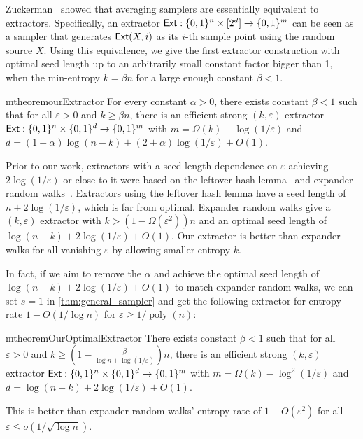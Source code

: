 \documentclass[10pt,a4paper]{article}
\DeclareMathOperator*{\poly}{poly}
\newcommand{\eps}{\varepsilon}
\newcommand{\1}{\mathbbm{1}}
\newcommand{\zo}{\{0, 1\}}
\newcommand{\Ext}{\textup{\textsf{Ext}}}
\begin{document}
Zuckerman~\cite{zuckerman1997randomness} showed that averaging samplers are essentially equivalent to extractors. Specifically, an extractor $\Ext: \zo^n \times [2^d] \to \zo^m$ can be seen as a sampler that generates $\Ext(X, i)$ as its $i$-th sample point using the random source $X$. Using this equivalence, we give the first extractor construction with optimal seed length up to an arbitrarily small constant factor bigger than 1, when the min-entropy $k = \beta n$ for a large enough constant $\beta < 1$.


\begin{restatable}{mtheorem}{ourExtractor}
    \label{thm:our_extractor}
    For every constant $\alpha > 0$, there exists constant $\beta < 1$ such that for all $\eps > 0$ and $k \ge  \beta n$, there is an efficient strong $(k, \eps)$ extractor $\Ext : \zo^n \times \zo^d \to \zo^m$ with $m = \Omega(k) - \log(1 / \eps)$ and $d = (1 + \alpha)\log (n-k) + (2 + \alpha) \log (1 / \eps) + O(1)$.
\end{restatable}

Prior to our work, extractors with a seed length dependence on $\eps$ achieving $2\log(1/\eps)$ or close to it were based on the leftover hash lemma~\cite{ILL89, BBR, IZ, HILL} and expander random walks~\cite{Gil93, Zuc07}. Extractors using the leftover hash lemma have a seed length of $n + 2 \log(1 / \eps)$, which is far from optimal. Expander random walks give a $(k, \eps)$ extractor with $k > (1 - \Omega(\eps^2))n$ and an optimal seed length of $\log(n - k) + 2\log(1 / \eps) + O(1)$. Our extractor is better than expander walks for all vanishing $\eps$ by allowing smaller entropy $k$.

In fact, if we aim to remove the $\alpha$ and achieve the optimal seed length of $\log(n - k) + 2\log(1 / \eps) + O(1)$ to match expander random walks, we can set $s = 1$ in \cref{thm:general_sampler} and get the following extractor for entropy rate $1-O(1/\log n)$ for $\eps \ge 1/\poly(n)$:

\begin{restatable}{mtheorem}{OurOptimalExtractor}
    \label{thm:our_optimal_extractor}
    There exists constant $\beta < 1$ such that for all $\eps > 0$ and $k \ge ( 1 - \frac{\beta}{\log n + \log(1/\eps)} ) n$, there is an efficient strong $(k, \eps)$ extractor $\Ext : \zo^n \times \zo^d \to \zo^m$ with $m = \Omega(k) - \log^2(1 / \eps)$ and $d = \log (n-k) + 2\log (1 / \eps) + O(1)$.
\end{restatable}


This is better than expander random walks' entropy rate of $1 - O(\eps^2)$ for all $\eps \le o(1 / \sqrt{\log n})$.
\end{document}
